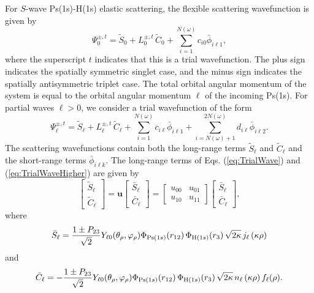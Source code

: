 \documentclass[preprint,showpacs,showkeys,preprintnumbers,amsmath,amssymb,longbibliography,pra,aps]{revtex4-1}
\begin{document}
For $S$-wave Ps(1s)-H(1s) elastic scattering, the flexible scattering
wavefunction is given by
\begin{equation}
\Psi_0^{\pm,t} = \widetilde{S}_0 + L_0^{\pm,t} \, \widetilde{C}_0
  + \sum_{i=1}^{N(\omega)} c_{i0} \bar{\phi}_{i\ell 1},
\label{eq:TrialWave}
\end{equation}
where the superscript $t$ indicates that this is a trial wavefunction. The plus
sign indicates the spatially symmetric singlet case, and the minus sign
indicates the spatially antisymmetric triplet case. The total orbital angular
momentum of the system is equal to the orbital angular momentum $\ell$ 
of the incoming Ps(1s). For partial waves $\ell > 0$, we consider a trial
wavefunction of the form
\begin{equation}
\Psi_\ell^{\pm,t} = \widetilde{S}_\ell + L^{\pm,t}_\ell \, \widetilde{C}_\ell
 + \sum_{i=1}^{N(\omega)} c_{i\ell} \bar{\phi}_{i\ell 1}
 + \!\!\!\sum_{i=N(\omega)+1}^{2N(\omega)} \!\! d_{i\ell} \bar{\phi}_{i\ell 2}.
\label{eq:TrialWaveHigher}
\end{equation}
The scattering wavefunctions contain both the long-range terms $\widetilde{S}_\ell$
and $\widetilde{C}_\ell$ and the short-range terms $\bar{\phi}_{i\ell k}$. The 
long-range terms of Eqs. (\ref{eq:TrialWave}) and (\ref{eq:TrialWaveHigher})
are given by
\begin{equation}
\label{eq:SCPhiDef}
\begin{bmatrix}
\widetilde{S}_\ell \\ \widetilde{C}_\ell
\end{bmatrix} = \textbf{u}  \begin{bmatrix}
\bar{S}_\ell \\ \bar{C}_\ell
\end{bmatrix} = \begin{bmatrix}
u_{00} & u_{01} \\  u_{10} & u_{11}
\end{bmatrix}
\begin{bmatrix}
\bar{S}_\ell \\ \bar{C}_\ell
\end{bmatrix}, 
\end{equation}
where
\begin{equation}
\label{eq:SBar}
\bar{S}_\ell = \frac{1\pm P_{23}}{\sqrt{2}}Y_{\ell 0}(\theta_\rho,
  \varphi_\rho)\Phi_{{\rm{Ps}}(1s)}\!\left(r_{12}\right) \Phi_{{\rm{H}}(1s)}\!\left(r_3\right)
  \sqrt{2\kappa} \,j_\ell\left(\kappa\rho\right)
\end{equation}
and
\begin{equation}
\label{eq:CBar}
\bar{C}_\ell = -\frac{1\pm P_{23}}{\sqrt{2}}Y_{\ell 0}(\theta_\rho,
  \varphi_\rho)\Phi_{{\rm{Ps}}(1s)}\!\left(r_{12}\right) \Phi_{{\rm{H}}(1s)}\!\left(r_3\right)
  \sqrt{2\kappa} \,n_\ell\left(\kappa\rho\right) f_\ell(\rho).
\end{equation}
\end{document}
